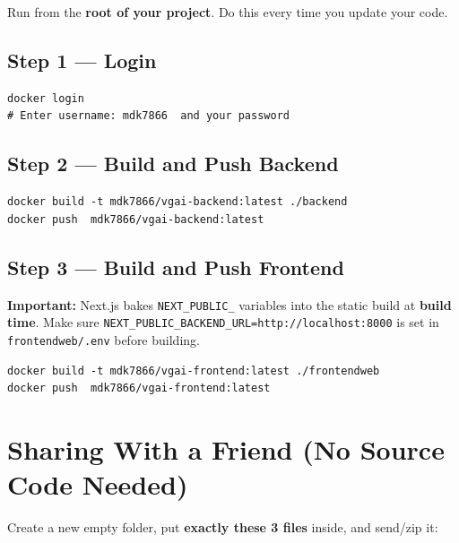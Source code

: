 \documentclass[12pt]{article}
\newenvironment{codeblock}{%
  \needspace{6\baselineskip}%
  \noindent\minipage{\linewidth}%
}{%
  \endminipage%
}
\begin{document}
Run from the \textbf{root of your project}. Do this every time you update your code.

\subsection{Step 1 — Login}
\begin{codeblock}
\begin{lstlisting}[style=commandstyle]
docker login
# Enter username: mdk7866  and your password
\end{lstlisting}
\end{codeblock}

\subsection{Step 2 — Build and Push Backend}
\begin{codeblock}
\begin{lstlisting}[style=commandstyle]
docker build -t mdk7866/vgai-backend:latest ./backend
docker push  mdk7866/vgai-backend:latest
\end{lstlisting}
\end{codeblock}

\subsection{Step 3 — Build and Push Frontend}
\begin{warningbox}
\textbf{Important:} Next.js bakes \texttt{NEXT\_PUBLIC\_} variables into the static build at \textbf{build time}. Make sure \texttt{NEXT\_PUBLIC\_BACKEND\_URL=http://localhost:8000} is set in \texttt{frontendweb/.env} before building.
\end{warningbox}
\begin{codeblock}
\begin{lstlisting}[style=commandstyle]
docker build -t mdk7866/vgai-frontend:latest ./frontendweb
docker push  mdk7866/vgai-frontend:latest
\end{lstlisting}
\end{codeblock}

\section{Sharing With a Friend (No Source Code Needed)}

Create a new empty folder, put \textbf{exactly these 3 files} inside, and send/zip it:
\end{document}
